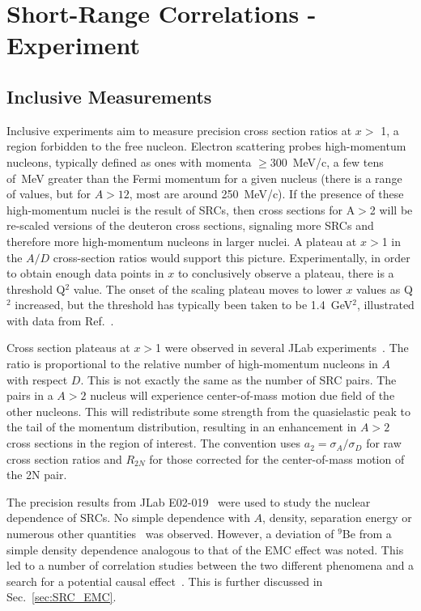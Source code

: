 \section{Short-Range Correlations - Experiment}
\subsection{Inclusive Measurements}
Inclusive experiments aim to measure precision cross section ratios at $x >$ 1, a region forbidden to the free nucleon.   Electron scattering probes high-momentum nucleons, typically defined as ones with momenta $\ge$300~MeV/c, a few tens of~MeV greater than the Fermi momentum for a given nucleus (there is a range of values, but for $A>12$, most are around 250~MeV/c). If the presence of these high-momentum nuclei is the result of SRCs, then cross sections for A$>$2 will be re-scaled versions of the deuteron cross sections, signaling more SRCs and therefore more high-momentum nucleons in larger nuclei.   A plateau at $x>$1 in the $A/D$ cross-section ratios would support this picture.    Experimentally, in order to obtain enough data points in $x$ to conclusively observe a plateau, there is a threshold Q$^2$ value.  The onset of the scaling plateau moves to lower $x$ values as Q$^2$ increased, but the threshold has typically been taken to be 1.4~GeV$^2$, illustrated with data from Ref.~\cite{Egiyan:2003vg}.

Cross section plateaus at $x>$1 were observed in several JLab experiments~\cite{Egiyan:2003vg, Fomin:2011ng}.  The ratio is proportional to the relative number of high-momentum nucleons in $A$ with respect $D$.  This is not exactly the same as the number of SRC pairs.   The pairs in a $A>2$ nucleus will experience center-of-mass motion due field of the other nucleons.  This will redistribute some strength from the quasielastic peak to the tail of the momentum distribution, resulting in an enhancement in $A>2$ cross sections in the region of interest.  The convention uses $a_2=\sigma_A/\sigma_D$ for raw cross section ratios and $R_{2N}$ for those corrected for the center-of-mass motion of the 2N pair. 


The precision results from JLab E02-019~\cite{Fomin:2011ng} were used to study the nuclear dependence of SRCs. No simple dependence with $A$, density, separation energy or numerous other quantities~\cite{PhysRevC.86.065204} was observed.  However, a deviation of $^9$Be from a simple density dependence analogous to that of the EMC effect was noted.  This led to a number of correlation studies between the two different phenomena and a search for a potential causal effect~\cite{PhysRevC.86.065204, Hen:2012fm, Weinstein:2010rt}.  This is further discussed in Sec.~\ref{sec:SRC_EMC}.

